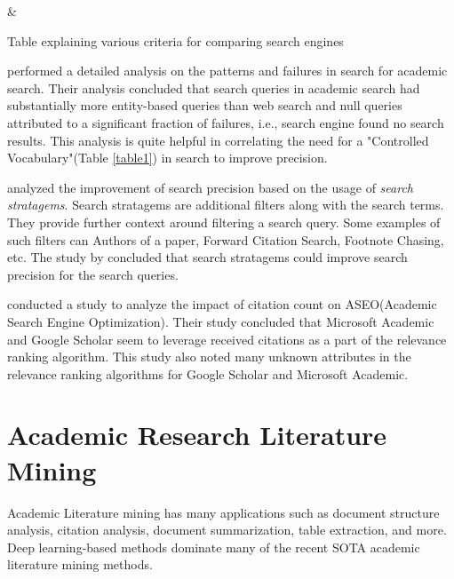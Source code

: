 \begin{table}[h]
    \label{table\arabic{tablecounter}}
            {\Criteria & \Meaning}
            \centering
            \caption{\label{tablecounter}Table explaining various criteria for comparing search engines}
\end{table}



\cite{li2017investigating} performed a detailed analysis on the patterns and failures in search for academic search. 
Their analysis concluded that search queries in academic search had substantially more entity-based queries than web search and 
null queries attributed to a significant fraction of failures, i.e., search engine found no search results. 
This analysis is quite helpful in correlating the need for a "Controlled Vocabulary"(Table \ref{table1}) in search to improve precision. 

\cite{kacem2018analysis} analyzed the improvement of search precision based on the usage of \textit{search stratagems}.
Search stratagems are additional filters along with the search terms. They provide further context around filtering a search query. 
Some examples of such filters can Authors of a paper, Forward Citation Search, Footnote Chasing, etc.
The study by \cite{kacem2018analysis} concluded that search stratagems could improve search precision for the search queries.

\cite{rovira2019ranking} conducted a study to analyze the impact of citation count on ASEO(Academic Search Engine Optimization). 
Their study concluded that Microsoft Academic and Google Scholar seem to leverage received citations as a part of the relevance 
ranking algorithm. This study also noted many unknown attributes in the relevance ranking algorithms for Google Scholar and Microsoft Academic.


\section{Academic Research Literature Mining}
\label{relatedwork:acad-lit-mining}
Academic Literature mining has many applications such as document structure analysis, citation analysis, document summarization, table extraction, and more. Deep learning-based methods dominate many of the recent SOTA academic literature mining methods. 

